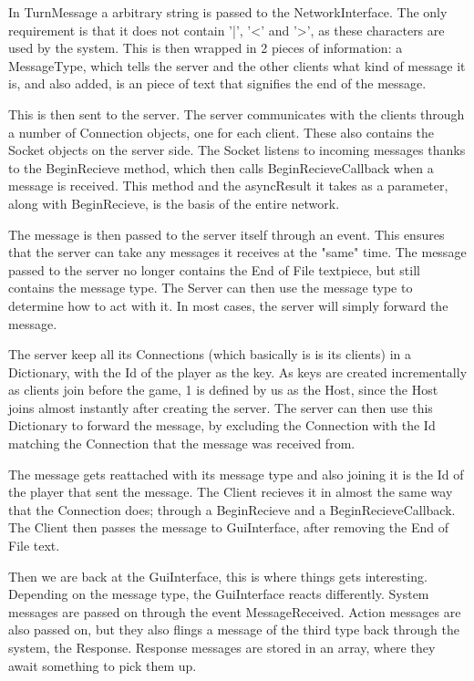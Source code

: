 In TurnMessage a arbitrary string is passed to the NetworkInterface.
The only requirement is that it does not contain '|', '<' and '>', as these characters are used by the system.
This is then wrapped in 2 pieces of information: a MessageType, which tells the server and the other clients what kind of message it is, and also added, is an piece of text that signifies the end of the message.

This is then sent to the server. The server communicates with the clients through a number of Connection objects, one for each client. 
These also contains the Socket objects on the server side. The Socket listens to incoming messages thanks to the BeginRecieve method, which then calls BeginRecieveCallback when a message is received. 
This method and the asyncResult it takes as a parameter, along with BeginRecieve, is the basis of the entire network.

The message is then passed to the server itself through an event.
This ensures that the server can take any messages it receives at the "same" time. 
The message passed to the server no longer contains the End of File textpiece, but still contains the message type.
The Server can then use the message type to determine how to act with it. In most cases, the server will simply forward the message.

The server keep all its Connections (which basically is is its clients) in a Dictionary, with the Id of the player as the key. 
As keys are created incrementally as clients join before the game, 1 is defined by us as the Host, since the Host joins almost instantly after creating the server.
The server can then use this Dictionary to forward the message, by excluding the Connection with the Id matching the Connection that the message was received from.

The message gets reattached with its message type and also joining it is the Id of the player that sent the message. 
The Client recieves it in almost the same way that the Connection does; through a BeginRecieve and a BeginRecieveCallback.
The Client then passes the message to GuiInterface, after removing the End of File text.

Then we are back at the GuiInterface, this is where things gets interesting. 
Depending on the message type, the GuiInterface reacts differently.
System messages are passed on through the event MessageReceived.
Action messages are also passed on, but they also flings a message of the third type back through the system, the Response.
Response messages are stored in an array, where they await something to pick them up.

